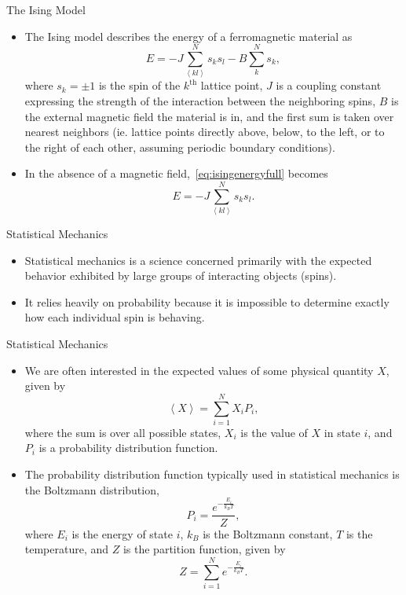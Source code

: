 \documentclass{beamer} %
\begin{document}
\begin{frame}{The Ising Model}
\begin{itemize}
\item The Ising model describes the energy of a ferromagnetic material as~\cite{lecture}
\begin{equation}
\label{eq:isingenergyfull}
E = -J\sum_{\left<kl\right>}^{N}s_{k}s_{l}-B\sum_{k}^{N}s_{k},
\end{equation}
where $s_{k}=\pm1$ is the spin of the $k^{\text{th}}$ lattice point, $J$ is a coupling constant expressing the strength of the interaction between the neighboring spins, $B$ is the external magnetic field the material is in, and the first sum is taken over nearest neighbors (ie. lattice points directly above, below, to the left, or to the right of each other, assuming periodic boundary conditions).  \item In the absence of a magnetic field,~\eqref{eq:isingenergyfull} becomes
\begin{equation}
\label{eq:isingenergy}
E = -J\sum_{\left<kl\right>}^{N}s_{k}s_{l}.
\end{equation}
\end{itemize}
\end{frame}

\begin{frame}{Statistical Mechanics}
\begin{itemize}
\item Statistical mechanics is a science concerned primarily with the expected behavior exhibited by large groups of interacting objects (spins).  
\item It relies heavily on probability because it is impossible to determine exactly how each individual spin is behaving.  
\end{itemize}
\end{frame}

\begin{frame}{Statistical Mechanics}
\begin{itemize}
\item We are often interested in the expected values of some physical quantity $X$, given by
\begin{equation}
\label{eq:expvaldef}
\left<X\right>=\sum_{i=1}^{N}X_{i}P_{i},
\end{equation}
where the sum is over all possible states, $X_{i}$ is the value of $X$ in state $i$, and $P_{i}$ is a probability distribution function.  \item The probability distribution function typically used in statistical mechanics is the Boltzmann distribution, 
\begin{equation}
\label{eq:boltzmann}
P_{i} = \frac{e^{-\frac{E_{i}}{k_{B}T}}}{Z},
\end{equation}
where $E_{i}$ is the energy of state $i$, $k_{B}$ is the Boltzmann constant, $T$ is the temperature, and $Z$ is the partition function, given by
\begin{equation}
\label{eq:partition}
Z=\sum_{i=1}^{N}e^{-\frac{E_{i}}{k_{B}T}}.
\end{equation}
\end{itemize}
\end{frame}
\end{document}
